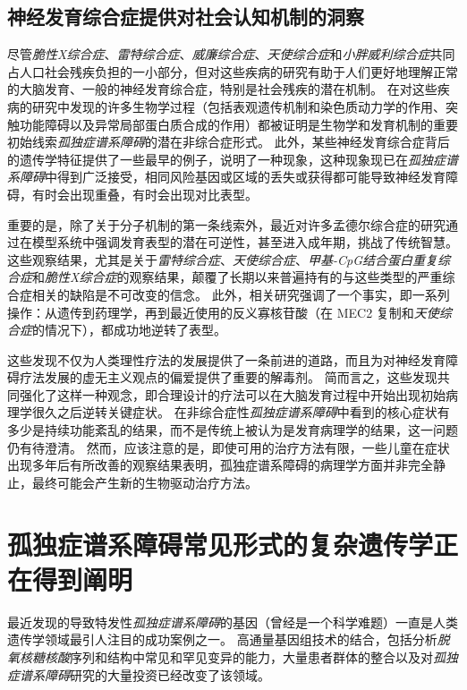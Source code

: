 \subsection{神经发育综合症提供对社会认知机制的洞察}

尽管\textit{脆性X综合症}、\textit{雷特综合症}、\textit{威廉综合症}、\textit{天使综合症}和\textit{小胖威利综合症}共同占人口社会残疾负担的一小部分，但对这些疾病的研究有助于人们更好地理解正常的大脑发育、一般的神经发育综合症，特别是社会残疾的潜在机制。
在对这些疾病的研究中发现的许多生物学过程（包括表观遗传机制和染色质动力学的作用、突触功能障碍以及异常局部蛋白质合成的作用）都被证明是生物学和发育机制的重要初始线索\textit{孤独症谱系障碍}的潜在非综合症形式。
此外，某些神经发育综合症背后的遗传学特征提供了一些最早的例子，说明了一种现象，这种现象现已在\textit{孤独症谱系障碍}中得到广泛接受，相同风险基因或区域的丢失或获得都可能导致神经发育障碍，有时会出现重叠，有时会出现对比表型。


重要的是，除了关于分子机制的第一条线索外，最近对许多孟德尔综合症的研究通过在模型系统中强调发育表型的潜在可逆性，甚至进入成年期，挑战了传统智慧。
这些观察结果，尤其是关于\textit{雷特综合症}、\textit{天使综合症}、\textit{甲基-CpG结合蛋白重复综合症}和\textit{脆性X综合症}的观察结果，颠覆了长期以来普遍持有的与这些类型的严重综合症相关的缺陷是不可改变的信念。
此外，相关研究强调了一个事实，即一系列操作：从遗传到药理学，再到最近使用的反义寡核苷酸（在 MEC2 复制和\textit{天使综合症}的情况下），都成功地逆转了表型。


这些发现不仅为人类理性疗法的发展提供了一条前进的道路，而且为对神经发育障碍疗法发展的虚无主义观点的偏爱提供了重要的解毒剂。
简而言之，这些发现共同强化了这样一种观念，即合理设计的疗法可以在大脑发育过程中开始出现初始病理学很久之后逆转关键症状。
在非综合症性\textit{孤独症谱系障碍}中看到的核心症状有多少是持续功能紊乱的结果，而不是传统上被认为是发育病理学的结果，这一问题仍有待澄清。
然而，应该注意的是，即使可用的治疗方法有限，一些儿童在症状出现多年后有所改善的观察结果表明，孤独症谱系障碍的病理学方面并非完全静止，最终可能会产生新的生物驱动治疗方法。



\section{孤独症谱系障碍常见形式的复杂遗传学正在得到阐明}

最近发现的导致特发性\textit{孤独症谱系障碍}的基因（曾经是一个科学难题）一直是人类遗传学领域最引人注目的成功案例之一。
高通量基因组技术的结合，包括分析\textit{脱氧核糖核酸}序列和结构中常见和罕见变异的能力，大量患者群体的整合以及对\textit{孤独症谱系障碍}研究的大量投资已经改变了该领域。


